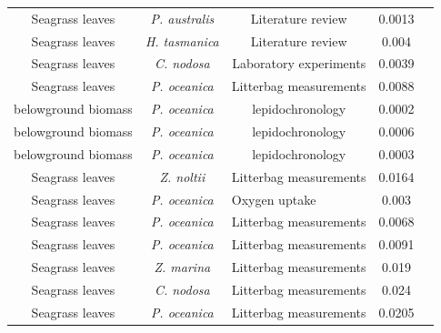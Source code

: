 \begin{table}[htbp]
\begin{tabular}{ccccc}
    \multicolumn{1}{c}{Seagrass leaves} & \textit{P. australis} & Literature review & 0.0013 &  \citealt{Harrison:1989tp} \\

    \multicolumn{1}{c}{Seagrass leaves} & \textit{H. tasmanica} & Literature review & 0.004 & \citealt{Harrison:1989tp} \\






    \multicolumn{1}{c}{Seagrass leaves} & \textit{C. nodosa} & Laboratory experiments & 0.0039 & \citealt{Peduzzi:1991up} \\

    \multicolumn{1}{c}{Seagrass leaves} & \textit{\textit{P. oceanica} } & Litterbag measurements & 0.0088 & \citealt{Romero:1992tx}\\

    \multicolumn{1}{c}{belowground biomass } & \textit{\textit{P. oceanica} } & lepidochronology & 0.0002 & \citealt{Romero:1992tx} \\

    \multicolumn{1}{c}{belowground biomass } & \textit{\textit{P. oceanica} } & lepidochronology & 0.0006 & \citealt{Romero:1992tx} \\

    \multicolumn{1}{c}{belowground biomass } & \textit{\textit{P. oceanica} } & lepidochronology & 0.0003 & \citealt{Romero:1992tx} \\


    \multicolumn{1}{c}{Seagrass leaves} & \textit{Z. noltii} & Litterbag measurements & 0.0164 & \citealt{Bourgues:1996ti} \\

    Seagrass leaves & \textit{\textit{P. oceanica} } & \multicolumn{1}{l}{Oxygen uptake} & 0.003 & \citealt{Mateo:1996tx} \\

    Seagrass leaves & \textit{\textit{P. oceanica} } & Litterbag measurements & 0.0068 & \citealt{Mateo:1996tx}  \\

    \multicolumn{1}{c}{Seagrass leaves} & \textit{P. oceanica} & Litterbag measurements & 0.0091 & \citealt{Cebrian:1997vp}\\

    \multicolumn{1}{c}{Seagrass leaves} & \textit{Z. marina} & Litterbag measurements & 0.019 & \citealt{Cebrian:1997vp} \\

    \multicolumn{1}{c}{Seagrass leaves} & \textit{C. nodosa} & Litterbag measurements & 0.024 & \citealt{Cebrian:1997vp} \\
    \multicolumn{1}{c}{Seagrass leaves} & \textit{\textit{P. oceanica} } & Litterbag measurements & 0.0205 & \citealt{Mateo:1997uw} \\




\end{tabular}
\end{table}
